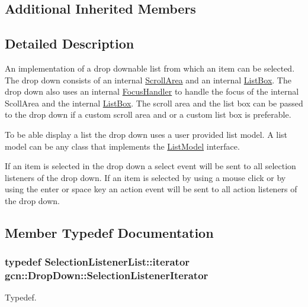 \subsection*{Additional Inherited Members}


\subsection{Detailed Description}
An implementation of a drop downable list from which an item can be selected. The drop down consists of an internal \hyperlink{classgcn_1_1ScrollArea}{Scroll\+Area} and an internal \hyperlink{classgcn_1_1ListBox}{List\+Box}. The drop down also uses an internal \hyperlink{classgcn_1_1FocusHandler}{Focus\+Handler} to handle the focus of the internal Scoll\+Area and the internal \hyperlink{classgcn_1_1ListBox}{List\+Box}. The scroll area and the list box can be passed to the drop down if a custom scroll area and or a custom list box is preferable.

To be able display a list the drop down uses a user provided list model. A list model can be any class that implements the \hyperlink{classgcn_1_1ListModel}{List\+Model} interface.

If an item is selected in the drop down a select event will be sent to all selection listeners of the drop down. If an item is selected by using a mouse click or by using the enter or space key an action event will be sent to all action listeners of the drop down. 

\subsection{Member Typedef Documentation}
\subsubsection[{\texorpdfstring{Selection\+Listener\+Iterator}{SelectionListenerIterator}}]{\setlength{\rightskip}{0pt plus 5cm}typedef Selection\+Listener\+List\+::iterator {\bf gcn\+::\+Drop\+Down\+::\+Selection\+Listener\+Iterator}\hspace{0.3cm}{\ttfamily [protected]}}\hypertarget{classgcn_1_1DropDown_a836c8426a53976c1fbecad118ae72ea7}{}\label{classgcn_1_1DropDown_a836c8426a53976c1fbecad118ae72ea7}
Typedef. 
